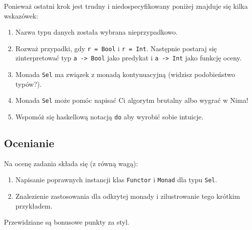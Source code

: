 \documentclass{article}[12pt]
\begin{document}
Ponieważ ostatni krok jest trudny i niedospecyfikowany poniżej znajduje się kilka
wskazówek:
\begin{enumerate}
    \item Nazwa typu danych została wybrana nieprzypadkowo.
    \item Rozważ przypadki, gdy \texttt{r = Bool} i \texttt{r = Int}. Następnie
        postaraj się zinterpretować typ \texttt{a -> Bool} jako predykat i
        \texttt{a -> Int} jako funkcję oceny.
    \item Monada \texttt{Sel} ma związek z monadą kontynuacyjną (widzisz podobieństwo
        typów?).
    \item Monada \texttt{Sel} może pomóc napisać Ci algorytm brutalny albo wygrać
        w Nima!
    \item Wspomóż się haskellową notacją \texttt{do} aby wyrobić sobie intuicje.
\end{enumerate}

\subsection{Ocenianie}
Na ocenę zadania składa się (z równą wagą):
\begin{enumerate}
    \item Napisanie poprawnych instancji klas \texttt{Functor} i \texttt{Monad}
        dla typu \texttt{Sel}.
    \item Znalezienie zastosowania dla odkrytej monady i zilustrowanie tego
        krótkim przykładem.
\end{enumerate}
Przewidziane są bonusowe punkty za styl.
\end{document}
